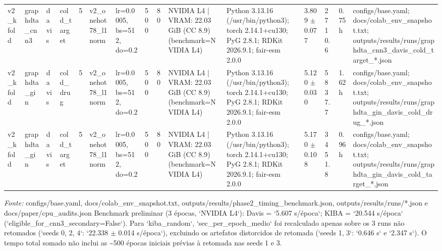 \begin{table}[htbp]
\begin{tabular}{lllllllllllllll}
v2\_kfold & graphdta\_cnn3 & davis & cold\_target & 5 & v2\_onehot78\_l1norm & lr=0.0005, bs=512, do=0.2 & 500 & 80 & NVIDIA L4 | VRAM: 22.03 GiB (CC 8.9) (benchmark=NVIDIA L4) & Python 3.13.16 (/usr/bin/python3); torch 2.14.1+cu130; PyG 2.8.1; RDKit 2026.9.1; fair-esm 2.0.0 & 3.809 $\pm$ 0.077 & 2710.6 & 0.75 h & configs/base.yaml; docs/colab\_env\_snapshot.txt; outputs/results/runs/graphdta\_cnn3\_davis\_cold\_target\_*.json \\
v2\_kfold & graphdta\_gin & davis & cold\_drug & 5 & v2\_onehot78\_l1norm & lr=0.0005, bs=512, do=0.2 & 500 & 80 & NVIDIA L4 | VRAM: 22.03 GiB (CC 8.9) (benchmark=NVIDIA L4) & Python 3.13.16 (/usr/bin/python3); torch 2.14.1+cu130; PyG 2.8.1; RDKit 2026.9.1; fair-esm 2.0.0 & 5.120 $\pm$ 0.030 & 5837.7 & 1.62 h & configs/base.yaml; docs/colab\_env\_snapshot.txt; outputs/results/runs/graphdta\_gin\_davis\_cold\_drug\_*.json \\
v2\_kfold & graphdta\_gin & davis & cold\_target & 5 & v2\_onehot78\_l1norm & lr=0.0005, bs=512, do=0.2 & 500 & 80 & NVIDIA L4 | VRAM: 22.03 GiB (CC 8.9) (benchmark=NVIDIA L4) & Python 3.13.16 (/usr/bin/python3); torch 2.14.1+cu130; PyG 2.8.1; RDKit 2026.9.1; fair-esm 2.0.0 & 5.170 $\pm$ 0.108 & 3451.8 & 0.96 h & configs/base.yaml; docs/colab\_env\_snapshot.txt; outputs/results/runs/graphdta\_gin\_davis\_cold\_target\_*.json \\
\bottomrule
\end{tabular}
\begin{flushleft}
\footnotesize \textit{Fonte:} configs/base.yaml, docs/colab\_env\_snapshot.txt, outputs/results/phase2\_timing\_benchmark.json, outputs/results/runs/*.json e docs/paper/cpu\_audits.json Benchmark preliminar (3 épocas, `NVIDIA L4`): Davis = `5.607 s/época`; KIBA = `20.544 s/época` (`eligible\_for\_cnn3\_secondary=False`). Para `kiba\_random`, `sec\_per\_epoch\_medio` foi recalculado apenas sobre os 3 runs não retomados (`seeds 0, 2, 4`: `22.338 $\pm$ 0.014 s/época`), excluindo os artefatos distorcidos de retomada (`seeds 1, 3`: `0.646 s` e `2.347 s`). O tempo total somado não inclui as \textasciitilde{}500 épocas iniciais prévias à retomada nas seeds 1 e 3.
\end{flushleft}
\end{table}
